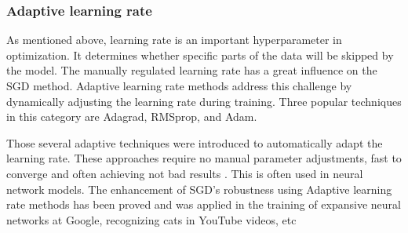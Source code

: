\documentclass[12pt,a4paper]{article}
\begin{document}
\subsubsection{Adaptive learning rate}

As mentioned above, learning rate is an important hyperparameter in optimization. It determines whether specific parts of the data will be skipped by the model. The manually regulated learning rate has a great influence on the SGD method. Adaptive learning rate methods address this challenge by dynamically adjusting the learning rate during training. Three popular techniques in this category are Adagrad, RMSprop, and Adam.

Those several adaptive techniques were introduced to automatically adapt the learning rate. These approaches require no manual parameter adjustments, fast to converge and often achieving not bad results \cite{optimization}. This is often used in neural network models. The enhancement of SGD's robustness using Adaptive learning rate methods has been proved and was applied in the training of expansive neural networks at Google, recognizing cats in YouTube videos, etc \cite{LSDDeepNet}
\end{document}
